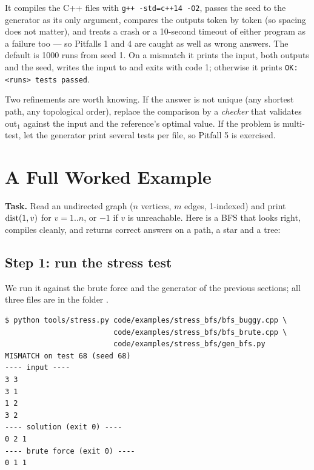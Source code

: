 It compiles the C++ files with \texttt{g++ -std=c++14 -O2}, passes the seed to the generator as its only argument, compares the outputs token by token (so spacing does not matter), and treats a crash or a 10-second timeout of either program as a failure too --- so Pitfalls 1 and 4 are caught as well as wrong answers. The default is 1000 runs from seed 1. On a mismatch it prints the input, both outputs and the seed, writes the input to  and exits with code 1; otherwise it prints \texttt{OK: <runs> tests passed}.



Two refinements are worth knowing. If the answer is not unique (any shortest path, any topological order), replace the comparison by a \emph{checker} that validates out$_1$ against the input and the reference's optimal value. If the problem is multi-test, let the generator print several tests per file, so Pitfall 5 is exercised.

\clneed
\section{A Full Worked Example}
\label{sec:ts-example}

\textbf{Task.} Read an undirected graph ($n$ vertices, $m$ edges, 1-indexed) and print $\operatorname{dist}(1, v)$ for $v = 1..n$, or $-1$ if $v$ is unreachable. Here is a BFS that looks right, compiles cleanly, and returns correct answers on a path, a star and a tree:



\subsection*{Step 1: run the stress test}

We run it against the brute force and the generator of the previous sections; all three files are in the folder .

\begin{lstlisting}[style=trace]
$ python tools/stress.py code/examples/stress_bfs/bfs_buggy.cpp \
                         code/examples/stress_bfs/bfs_brute.cpp \
                         code/examples/stress_bfs/gen_bfs.py
MISMATCH on test 68 (seed 68)
---- input ----
3 3
3 1
1 2
3 2
---- solution (exit 0) ----
0 2 1
---- brute force (exit 0) ----
0 1 1
\end{lstlisting}

